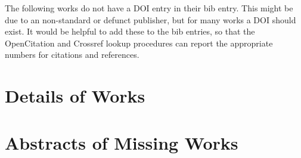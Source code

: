 \documentclass[a4paper]{article}
\begin{document}
The following works do not have a DOI entry in their bib entry. This might be due to an non-standard or defunct publisher, but for many works a DOI should exist. It would be helpful to add these to the bib entries, so that the OpenCitation and Crossref lookup procedures can report the appropriate numbers for citations and references.



\clearpage
\section{Details of Works}



\clearpage
\section{Abstracts of Missing Works}




\printindex
\end{document}
